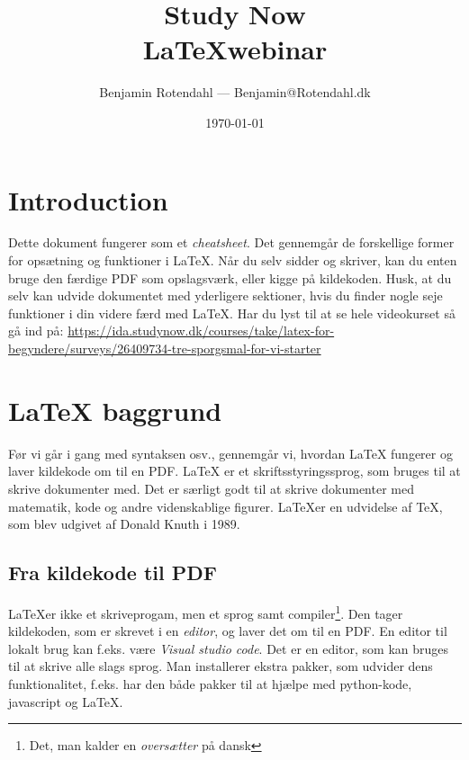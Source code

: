 \documentclass{article}
\title{
  \vspace{13em}
  \large{Study Now} \\
  \Large{\LaTeX webinar} \\
}
\author{
  Benjamin Rotendahl --- Benjamin@Rotendahl.dk
}
\date{
  \vspace{22em}
  \today
}
\begin{document}
\clearpage

\maketitle		%
\thispagestyle{empty}
\newpage

\thispagestyle{empty}\tableofcontents\newpage %

\setcounter{page}{1}

\section{Introduction}
 Dette dokument fungerer som et \emph{cheatsheet}. Det gennemgår de forskellige
 former for opsætning og funktioner i \LaTeX. Når du selv sidder og skriver, kan
 du enten bruge den færdige PDF som opslagsværk, eller kigge på kildekoden.
 Husk, at du selv kan udvide dokumentet med yderligere sektioner, hvis du finder
 nogle seje funktioner i din videre færd med \LaTeX{}.
Har du lyst til at se hele videokurset så gå ind på:
\url{https://ida.studynow.dk/courses/take/latex-for-begyndere/surveys/26409734-tre-sporgsmal-for-vi-starter}

\section{\LaTeX{} baggrund}
 Før vi går i gang med syntaksen osv., gennemgår vi, hvordan \LaTeX{} fungerer og
 laver kildekode om til en PDF.
 \LaTeX{} er et skriftsstyringssprog, som bruges til at skrive dokumenter med. Det er
 særligt godt til at skrive dokumenter med matematik, kode og andre
 videnskablige figurer. \LaTeX er en udvidelse af TeX, som blev udgivet af Donald
 Knuth i 1989.

 \subsection{Fra kildekode til PDF}\label{sec:local}
   \LaTeX er ikke et skriveprogam, men et sprog samt compiler\footnote{
     Det, man kalder en \emph{oversætter} på dansk}. Den tager kildekoden, som er skrevet i en
   \emph{editor}, og laver det om til en PDF. En editor til lokalt brug kan
   f.eks. være \emph{Visual studio code}\cite{vscode}. Det er en editor, som kan
   bruges til at skrive alle slags sprog. Man installerer ekstra pakker, som
   udvider dens funktionalitet, f.eks. har den både pakker til at hjælpe med
   python-kode, javascript og \LaTeX{}\cite{latexPackage}.
\end{document}
